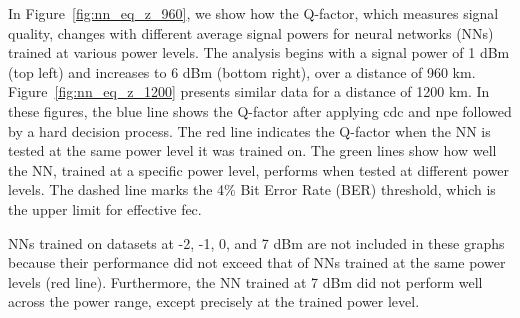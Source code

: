 
In Figure~\ref{fig:nn_eq_z_960}, we show how the Q-factor, which measures signal quality, changes with different average signal powers for neural networks (NNs) trained at various power levels. The analysis begins with a signal power of 1 dBm (top left) and increases to 6 dBm (bottom right), over a distance of 960 km. Figure~\ref{fig:nn_eq_z_1200} presents similar data for a distance of 1200 km. In these figures, the blue line shows the Q-factor after applying \acrfull{cdc} and \acrfull{npe} followed by a hard decision process. The red line indicates the Q-factor when the NN is tested at the same power level it was trained on. The green lines show how well the NN, trained at a specific power level, performs when tested at different power levels. The dashed line marks the 4\% Bit Error Rate (BER) threshold, which is the upper limit for effective \acrlong{fec}.

NNs trained on datasets at -2, -1, 0, and 7 dBm are not included in these graphs because their performance did not exceed that of NNs trained at the same power levels (red line). Furthermore, the NN trained at 7 dBm did not perform well across the power range, except precisely at the trained power level.


